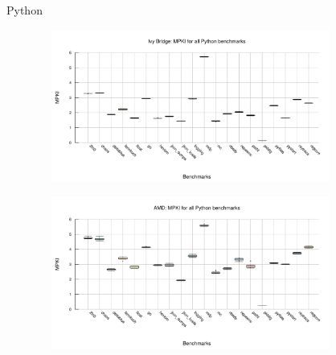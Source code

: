 \documentclass[10pt]{beamer}
\begin{document}
\begin{frame}{Python}
	\begin{minipage}{\textwidth}
		\begin{figure}
        \includegraphics[width=10cm, height=5cm]{figures/python_box_ivy_bridge.pdf}
		\end{figure}
	\end{minipage}
		\begin{minipage}{\textwidth}
			\begin{figure}
				\includegraphics[width=10cm, height=5cm]{figures/python_box_amd.pdf}
			\end{figure}
		\end{minipage}
\end{frame}
\end{document}
